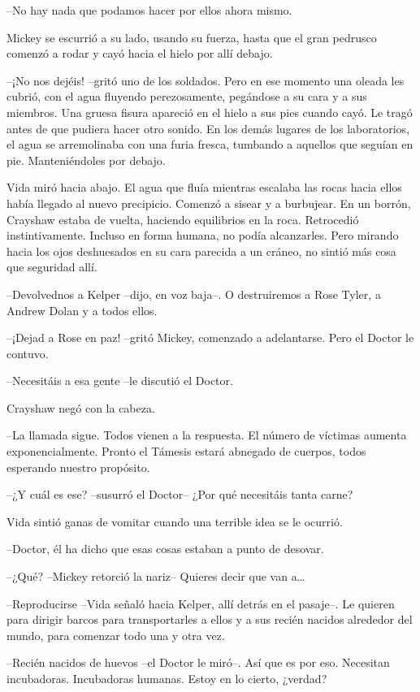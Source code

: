 {--No hay nada que podamos hacer por ellos ahora mismo.}

{Mickey se escurrió a su lado, usando su fuerza, hasta que el gran
pedrusco comenzó a rodar y cayó hacia el hielo por allí debajo.}

{--¡No nos dejéis! --gritó uno de los soldados. Pero en ese momento una
 oleada les cubrió, con el agua fluyendo perezosamente, pegándose a su
 cara y a sus miembros. Una gruesa fisura apareció en el hielo a sus pies
 cuando cayó. Le tragó antes de que pudiera hacer otro sonido. En los
 demás lugares de los laboratorios, el agua se arremolinaba con una furia
 fresca, tumbando a aquellos que seguían en pie. Manteniéndoles por
debajo.}

{Vida miró hacia abajo. El agua que fluía mientras escalaba las rocas
 hacia ellos había llegado al nuevo precipicio. Comenzó a sisear y a
 burbujear. En un borrón, Crayshaw estaba de vuelta, haciendo equilibrios
 en la roca. Retrocedió instintivamente. Incluso en forma humana, no
 podía alcanzarles. Pero mirando hacia los ojos deshuesados en su cara
parecida a un cráneo, no sintió más cosa que seguridad allí.}

{--Devolvednos a Kelper --dijo, en voz baja--. O destruiremos a Rose
Tyler, a Andrew Dolan y a todos ellos.}

{--¡Dejad a Rose en paz! --gritó Mickey, comenzado a adelantarse. Pero
el Doctor le contuvo.}

{--Necesitáis a esa gente --le discutió el Doctor.}

{Crayshaw negó con la cabeza.}

{--La llamada sigue. Todos vienen a la respuesta. El número de víctimas
 aumenta exponencialmente. Pronto el Támesis estará abnegado de cuerpos,
todos esperando nuestro propósito.}

{--¿Y cuál es ese? --susurró el Doctor-- ¿Por qué necesitáis tanta
carne?}

{Vida sintió ganas de vomitar cuando una terrible idea se le ocurrió.}

{--Doctor, él ha dicho que esas cosas estaban a punto de desovar.}

{--¿Qué? --Mickey retorció la nariz-- Quieres decir que van a\ldots{}}

{--Reproducirse --Vida señaló hacia Kelper, allí detrás en el pasaje--.
 Le quieren para dirigir barcos para transportarles a ellos y a sus
recién nacidos alrededor del mundo, para comenzar todo una y otra vez.}

{--Recién nacidos de huevos --el Doctor le miró--. Así que es por eso.
 Necesitan incubadoras. Incubadoras humanas. Estoy en lo cierto,
¿verdad?}


